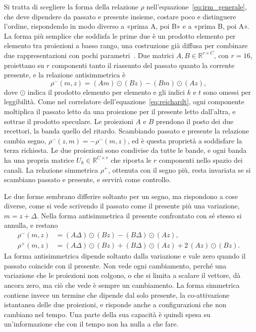 Si tratta di scegliere la forma della relazione $\rho$ nell'equazione~\eqref{eq:irm_generale}, che deve dipendere da passato e presente insieme, costare poco e distinguere l'ordine, rispondendo in modo diverso a «prima A, poi B» e a «prima B, poi A». La forma più semplice che soddisfa le prime due è un prodotto elemento per elemento tra proiezioni a basso rango, una costruzione già diffusa per combinare due rappresentazioni con pochi parametri~\cite{kim2017hadamard}. Due matrici $A,B\in\mathbb R^{r\times C}$, con $r=16$, proiettano su $r$ componenti tanto il riassunto del passato quanto la corrente presente, e la relazione antisimmetrica è
\begin{equation}
\label{eq:relazione_antisimmetrica}
\rho^{-}(m,z)=(Am)\odot(Bz)-(Bm)\odot(Az),
\end{equation}
dove $\odot$ indica il prodotto elemento per elemento e gli indici $k$ e $t$ sono omessi per leggibilità. Come nel correlatore dell'equazione~\eqref{eq:reichardt}, ogni componente moltiplica il passato letto da una proiezione per il presente letto dall'altra, e sottrae il prodotto speculare. Le proiezioni $A$ e $B$ prendono il posto dei due recettori, la banda quello del ritardo. Scambiando passato e presente la relazione cambia segno, $\rho^{-}(z,m)=-\rho^{-}(m,z)$, ed è questa proprietà a soddisfare la terza richiesta. Le due proiezioni sono condivise da tutte le bande, e ogni banda ha una propria matrice $U_k\in\mathbb R^{C\times r}$ che riporta le $r$ componenti nello spazio dei canali. La relazione simmetrica $\rho^{+}$, ottenuta con il segno più, resta invariata se si scambiano passato e presente, e servirà come controllo.

Le due forme sembrano differire soltanto per un segno, ma rispondono a cose diverse, come si vede scrivendo il passato come il presente più una variazione, $m=z+\Delta$. Nella forma antisimmetrica il presente confrontato con sé stesso si annulla, e restano
\begin{align}
\label{eq:relazione_variazione}
\rho^{-}(m,z)&=(A\Delta)\odot(Bz)-(B\Delta)\odot(Az),\\
\rho^{+}(m,z)&=(A\Delta)\odot(Bz)+(B\Delta)\odot(Az)+2\,(Az)\odot(Bz).\nonumber
\end{align}
La forma antisimmetrica dipende soltanto dalla variazione e vale zero quando il passato coincide con il presente. Non vede ogni cambiamento, perché una variazione che le proiezioni non colgono, o che si limita a scalare il vettore, dà ancora zero, ma ciò che vede è sempre un cambiamento. La forma simmetrica contiene invece un termine che dipende dal solo presente, la co-attivazione istantanea delle due proiezioni, e risponde anche a configurazioni che non cambiano nel tempo. Una parte della sua capacità è quindi spesa su un'informazione che con il tempo non ha nulla a che fare.

